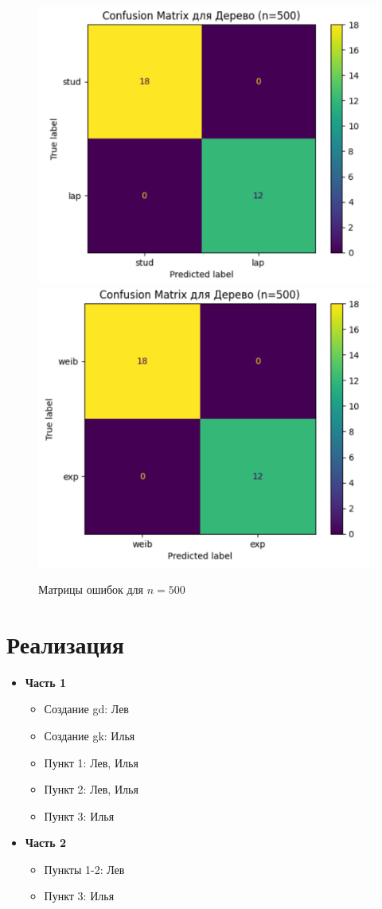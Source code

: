 \documentclass{HSEtitle}
\begin{document}
\begin{figure}[H]
    \centering
    \includegraphics[width=0.45\linewidth]{Confusion matrix lap and stud 3.png}
    \hfill
    \includegraphics[width=0.45\linewidth]{Confusion matrix weih and exp 3.png}
    \caption{Матрицы ошибок для $n=500$}
    \label{fig:cm500}
\end{figure}

\section*{Реализация}
\begin{itemize}
    \item \textbf{Часть 1}
    \begin{itemize}
        \item Создание gd: Лев
        \item Создание gk: Илья
        \item Пункт 1: Лев, Илья
        \item Пункт 2: Лев, Илья
        \item Пункт 3: Илья
    \end{itemize}
    
    \item \textbf{Часть 2}
    \begin{itemize}
        \item Пункты 1-2: Лев
        \item Пункт 3: Илья
    \end{itemize}
\end{itemize}
\end{document}
